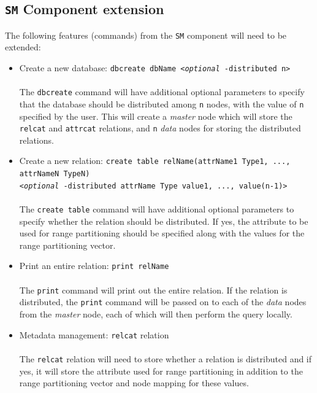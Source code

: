 \documentclass[letterpaper,11pt]{article}
\begin{document}
\subsection{\texttt{SM} Component extension}
The following features (commands) from the \texttt{SM} component will need to be extended:
\begin{itemize}
\item Create a new database: \texttt{dbcreate dbName <{\it optional} -distributed n>}\\
\\The \texttt{dbcreate} command will have additional optional parameters to specify
that the database should be distributed among \texttt{n} nodes, with the value of \texttt{n}
specified by the user. This will create a \textit{master} node which will store the \texttt{relcat}
and \texttt{attrcat} relations, and \texttt{n} \textit{data} nodes for storing the distributed
relations.

\item Create a new relation: \texttt{create table relName(attrName1 Type1, ..., attrNameN TypeN)
\\<{\it optional} -distributed attrName Type value1, ..., value(n-1)>}\\
\\The \texttt{create table} command will have additional optional parameters to specify whether
the relation should be distributed. If yes, the attribute to be used for range partitioning should
be specified along with the values for the range partitioning vector.

\item Print an entire relation: \texttt{print relName}\\
\\The \texttt{print} command will print out the entire relation. If the relation is distributed,
the \texttt{print} command will be passed on to each of the \textit{data} nodes from the \textit
{master} node, each of which will then perform the query locally.

\item Metadata management: \texttt{relcat} relation\\
\\ The \texttt{relcat} relation will need to store whether a relation is distributed and if yes,
it will store the attribute used for range partitioning in addition to the range partitioning
vector and node mapping for these values.

\end{itemize}
\end{document}
